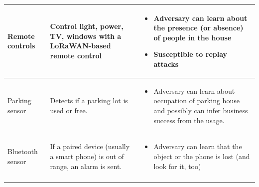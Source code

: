 {\begin{longtable}[c]{|l|l|l|}
\begin{minipage}[t]{0.20\columnwidth}
{Remote controls}
\strut\end{minipage} &
\begin{minipage}[t]{0.30\columnwidth}\raggedright\strut
{Control light, power, TV, windows with a LoRaWAN-based remote control}
\strut\end{minipage} &
\begin{minipage}[t]{0.40\columnwidth}\raggedright\strut
\begin{itemize}
\tightlist
\item
  {Adversary can learn about the presence (or absence) of people in the house}
\item
  {Susceptible to replay attacks}
\end{itemize}
\strut\end{minipage}\tabularnewline
\hline
\begin{minipage}[t]{0.20\columnwidth}\raggedright\strut
{Parking sensor}
\strut\end{minipage} &
\begin{minipage}[t]{0.30\columnwidth}\raggedright\strut
{Detects if a parking lot is used or free.}
\strut\end{minipage} &
\begin{minipage}[t]{0.40\columnwidth}\raggedright\strut
\begin{itemize}
\tightlist
\item
  {Adversary can learn about occupation of parking house and possibly
  can infer business success from the usage.}
\end{itemize}
\strut\end{minipage}\tabularnewline
\hline
\begin{minipage}[t]{0.20\columnwidth}\raggedright\strut
{Bluetooth sensor}
\strut\end{minipage} &
\begin{minipage}[t]{0.30\columnwidth}\raggedright\strut
{If a paired device (usually a smart phone) is out of range, an alarm is sent.}
\strut\end{minipage} &
\begin{minipage}[t]{0.40\columnwidth}\raggedright\strut
\begin{itemize}
\tightlist
\item
  {Adversary can learn that the object or the phone is lost (and look
  for it, too)}
\end{itemize}
\strut\end{minipage}\tabularnewline
\hline
\begin{minipage}[t]{0.20\columnwidth}\raggedright\strut

\end{minipage}
\end{longtable}}
